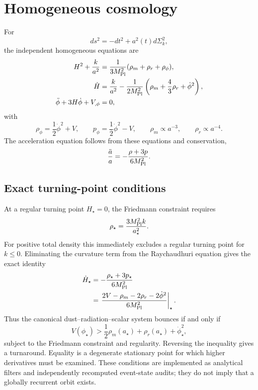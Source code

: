 \section{Homogeneous cosmology}
For
\begin{equation}
ds^2=-dt^2+a^2(t)d\Sigma_k^2,
\end{equation}
the independent homogeneous equations are
\begin{align}
H^2+\frac{k}{a^2}&=\frac{1}{3M_{\mathrm{Pl}}^2}(\rho_m+\rho_r+\rho_\phi),\\
\dot H&=\frac{k}{a^2}-\frac{1}{2M_{\mathrm{Pl}}^2}\left(\rho_m+\frac43\rho_r+\dot\phi^2\right),\\
\ddot\phi+3H\dot\phi+V_{,\phi}&=0,
\end{align}
with
\begin{equation}
\rho_\phi=\frac12\dot\phi^2+V,\qquad
p_\phi=\frac12\dot\phi^2-V,\qquad
\rho_m\propto a^{-3},\qquad \rho_r\propto a^{-4}.
\end{equation}
The acceleration equation follows from these equations and conservation,
\begin{equation}
\frac{\ddot a}{a}=-\frac{\rho+3p}{6M_{\mathrm{Pl}}^2}.
\end{equation}

\subsection{Exact turning-point conditions}
At a regular turning point $H_\star=0$, the Friedmann constraint requires
\begin{equation}
\rho_\star=\frac{3M_{\mathrm{Pl}}^2k}{a_\star^2}.
\end{equation}
For positive total density this immediately excludes a regular turning point for $k\le0$. Eliminating the curvature term from the Raychaudhuri equation gives the exact identity
\begin{align}
\dot H_\star
&=-\frac{\rho_\star+3p_\star}{6M_{\mathrm{Pl}}^2}\\
&=\left.\frac{2V-\rho_m-2\rho_r-2\dot\phi^2}{6M_{\mathrm{Pl}}^2}\right|_\star.
\end{align}
Thus the canonical dust--radiation--scalar system bounces if and only if
\begin{equation}
V(\phi_\star)>\frac12\rho_m(a_\star)+\rho_r(a_\star)+\dot\phi_\star^2,
\end{equation}
subject to the Friedmann constraint and regularity. Reversing the inequality gives a turnaround. Equality is a degenerate stationary point for which higher derivatives must be examined. These conditions are implemented as analytical filters and independently recomputed event-state audits; they do not imply that a globally recurrent orbit exists.

